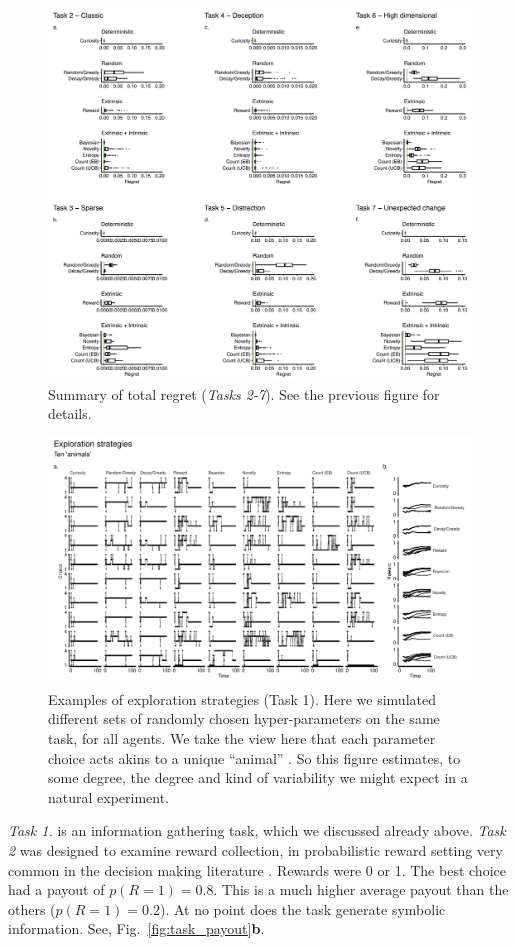 \begin{figure}
    \label{fig:supp_regret} 
	\includegraphics[width=11.4cm]{img/supp_regret.pdf} 
	\caption{Summary of total regret (\textit{Tasks 2-7}). See the previous figure for details.}
\end{figure}

\begin{figure}
    \label{fig:exploration1} 
	\includegraphics[width=11.4cm]{img/exploration1.pdf}
	\caption{Examples of exploration strategies (Task 1). Here we simulated different sets of randomly chosen hyper-parameters on the same task, for all agents. We take the view here that each parameter choice acts akins to a unique ``animal'' \cite{Prescott2006}. So this figure estimates, to some degree, the degree and kind of variability we might expect in a natural experiment. 
  	}
\end{figure}

\textit{Task 1.} is an information gathering task, which we discussed already above. \textit{Task 2} was designed to examine reward collection, in probabilistic reward setting very common in the decision making literature \cite{schonberg2007reinforcement,frank2004carrot,cavanagh2014conflict,jahfari2019cross,collins2014opponent,collins2017interactions,glascher2010states}. Rewards were 0 or 1. The best choice had a payout of $p(R=1) = 0.8$. This is a much higher average payout than the others ($p(R=1) = 0.2$). At no point does the task generate symbolic information. See, Fig.~\ref{fig:task_payout}\textbf{b}. 

